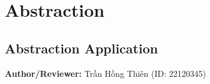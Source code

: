 \section{Abstraction}

\subsection{Abstraction Application}
\noindent\textbf{Author/Reviewer:} Trần Hồng Thiên (ID: 22120345)


